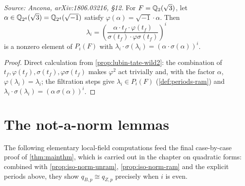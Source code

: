 \begin{corollary}[Explicit period, \(F = \Q_2(\sqrt 3)\)]
  \label{cor:period-wild2}
  \textit{Source: Ancona, arXiv:1806.03216, \S12.}
  For \(F = \Q_2(\sqrt 3)\), let \(\alpha \in \mathbb{Q}_{2^4}(\sqrt 3) =
  \mathbb{Q}_{2^4}(\sqrt{-1})\) satisfy \(\varphi(\alpha) = \sqrt{-1} \cdot \alpha\).
  Then
  \[\lambda_i = \left(\frac{\alpha \cdot t_f \cdot \varphi(t_f)}{\sigma(t_f)
    \cdot \varphi\sigma(t_f)}\right)^i\]
  is a nonzero element of \(P_i(F)\) with \(\lambda_i \cdot \sigma(\lambda_i) =
  (\alpha \cdot \sigma(\alpha))^i\).
\end{corollary}

\begin{proof}
  Direct calculation from \cref{prop:lubin-tate-wild2}: the combination of
  \(t_f, \varphi(t_f), \sigma(t_f), \varphi\sigma(t_f)\) makes \(\varphi^2\) act
  trivially and, with the factor \(\alpha\), \(\varphi(\lambda_i) = \lambda_i\);
  the filtration steps give \(\lambda_i \in P_i(F)\) (\cref{def:periods-ram}) and
  \(\lambda_i \cdot \sigma(\lambda_i) = (\alpha\,\sigma(\alpha))^i\).
\end{proof}

\section{The not-a-norm lemmas}
\label{sec:not-norm}

The following elementary local-field computations feed the final case-by-case
proof of \cref{thm:mainthm}, which is carried out in the chapter on quadratic
forms: combined with \cref{prop:iso-norm-unram}, \cref{prop:iso-norm-ram} and
the explicit periods above, they show \(q_{B,p} \cong q_{Z,p}\) precisely when
\(i\) is even.

